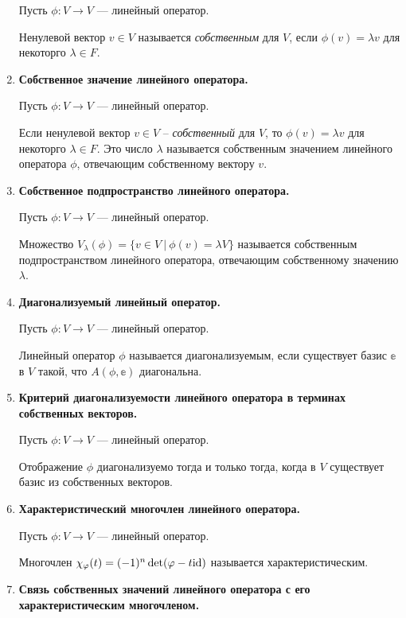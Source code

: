 \begin{enumerate}
Пусть $\phi\colon V \rightarrow V$ --- линейный оператор.

Ненулевой вектор $v\in V$ называется \textit{собственным} для $V$, если $\phi(v) = \lambda v$ для некоторго $\lambda \in F$.
\item \textbf{Собственное значение линейного оператора.}

Пусть $\phi\colon V \rightarrow V$ --- линейный оператор.

Если ненулевой вектор $v\in V$ -- \textit{собственный} для $V$, то $\phi(v) = \lambda v$ для некоторго $\lambda \in F$. Это число $\lambda$ называется собственным значением линейного оператора $\phi$, отвечающим собственному вектору $v$.
\item \textbf{Собственное подпространство линейного оператора.}

Пусть $\phi\colon V \rightarrow V$ --- линейный оператор.

Множество $V_{\lambda}(\phi) = \{v\in V\ |\ \phi(v) = \lambda V\}$ называется собственным подпространством линейного оператора, отвечающим собственному значению $\lambda$.
\item \textbf{Диагонализуемый линейный оператор.}

Пусть $\phi\colon V \rightarrow V$ --- линейный оператор.

Линейный оператор $\phi$ называется диагонализуемым, если существует базис $\mathbb{e}$ в $V$ такой, что $A(\phi, \mathbb{e})$ диагональна. 
\item \textbf{Критерий диагонализуемости линейного оператора в терминах собственных векторов.}

Пусть $\phi\colon V \rightarrow V$ --- линейный оператор.

Отображение $\phi$ диагонализуемо тогда и только тогда, когда в $V$ существует базис из собственных векторов.
\item \textbf{Характеристический многочлен линейного оператора.}

Пусть $\phi\colon V \rightarrow V$ --- линейный оператор.

Многочлен $\chi_{\varphi}(t) = (-1)^n\det(\varphi - t \mathrm{id})$ называется характеристическим.
\item \textbf{Связь собственных значений линейного оператора с его характеристическим многочленом.}


\end{enumerate}
